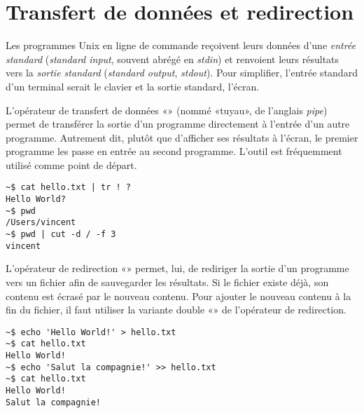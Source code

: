 

\section{Transfert de données et redirection}
\label{sec:cli:flux}

Les programmes Unix en ligne de commande reçoivent leurs données d'une
\emph{entrée standard} (\emph{standard
  input}, souvent abrégé en \emph{stdin}) et renvoient leurs résultats
vers la \emph{sortie standard} (\emph{standard output},
\emph{stdout}). Pour simplifier, l'entrée standard d'un terminal
serait le clavier et la sortie standard, l'écran.

L'opérateur de transfert de données %
%
«\code{\textbar}» (nommé «tuyau», de l'anglais \emph{pipe}) permet de
transférer la sortie d'un programme directement à l'entrée d'un autre
programme. Autrement dit, plutôt que d'afficher ses résultats à
l'écran, le premier programme les passe en entrée au second programme.
L'outil  est fréquemment utilisé comme point de départ.
\begin{Schunk}
\begin{Verbatim}
~$ cat hello.txt | tr ! ?
Hello World?
~$ pwd
/Users/vincent
~$ pwd | cut -d / -f 3
vincent
\end{Verbatim}
\end{Schunk} %


L'opérateur de redirection %
«\code{>}» permet, lui, de
rediriger la sortie d'un programme vers un fichier afin de sauvegarder
les résultats. Si le fichier existe déjà, son contenu est écrasé par
le nouveau contenu. Pour ajouter le nouveau contenu à la fin du
fichier, il faut utiliser la variante double %
«\code{>>}» de l'opérateur de
redirection.
\begin{Schunk}
\begin{Verbatim}
~$ echo 'Hello World!' > hello.txt
~$ cat hello.txt
Hello World!
~$ echo 'Salut la compagnie!' >> hello.txt
~$ cat hello.txt
Hello World!
Salut la compagnie!
\end{Verbatim}
\end{Schunk}

